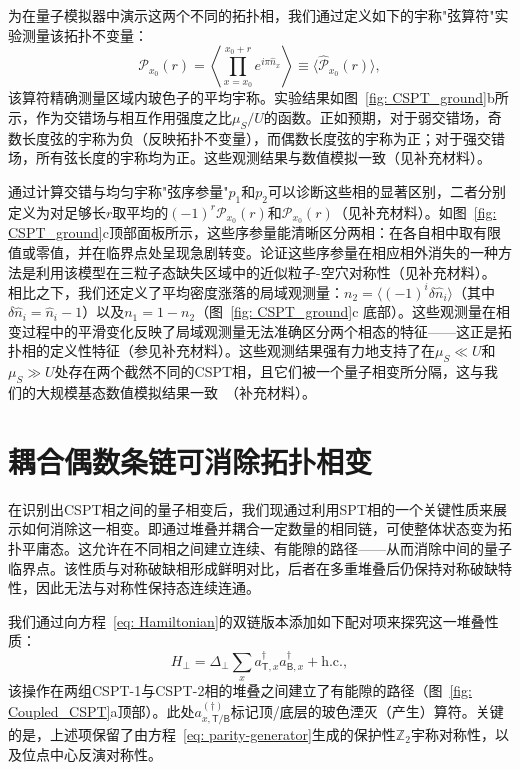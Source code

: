 \documentclass[preprint,superscriptaddress,floatfix, nofootinbib]{revtex4-2}
\begin{document}
\begin{CJK*}{UTF8}{gbsn}
为在量子模拟器中演示这两个不同的拓扑相，我们通过定义如下的宇称"弦算符"实验测量\cite{Hilker17, Wei23}该拓扑不变量：
\begin{equation}
\label{eq: POP}
\mathcal{P}_{x_0}(r) =  \left\langle \prod_{x=x_0}^{x_0+r} e^{i\pi \hat n_x}\right\rangle \equiv \langle \hat{\mathcal{P}}_{x_0}(r) \rangle,
\end{equation}
该算符精确测量区域内玻色子的平均宇称。实验结果如图~\ref{fig: CSPT_ground}b所示，作为交错场与相互作用强度之比$\mu_S/U$的函数。正如预期，对于弱交错场，奇数长度弦的宇称为负（反映拓扑不变量），而偶数长度弦的宇称为正；对于强交错场，所有弦长度的宇称均为正。这些观测结果与数值模拟一致（见补充材料）。

通过计算交错与均匀宇称"弦序参量"$p_1$和$p_2$可以诊断这些相的显著区别，二者分别定义为对足够长$r$取平均的$(-1)^{r} \mathcal{P}_{x_0}(r)$和$\mathcal{P}_{x_0}(r)$（见补充材料）。如图~\ref{fig: CSPT_ground}c顶部面板所示，这些序参量能清晰区分两相：在各自相中取有限值或零值，并在临界点处呈现急剧转变。论证这些序参量在相应相外消失的一种方法是利用该模型在三粒子态缺失区域中的近似粒子-空穴对称性（见补充材料）。
相比之下，我们还定义了平均密度涨落的局域观测量：$n_2= \langle (-1)^i\delta\hat{n}_i\rangle $（其中$\delta \hat{n}_i=\hat{n}_i-1$）以及$n_1= 1 - n_2$（图~\ref{fig: CSPT_ground}c 底部）。这些观测量在相变过程中的平滑变化反映了局域观测量无法准确区分两个相态的特征——这正是拓扑相的定义性特征（参见补充材料）。这些观测结果强有力地支持了在$\mu_S \ll U$和$\mu_S \gg U$处存在两个截然不同的CSPT相，且它们被一个量子相变所分隔，这与我们的大规模基态数值模拟结果一致~\cite{Sahay2025}（补充材料）。
\section{耦合偶数条链可消除拓扑相变}

在识别出CSPT相之间的量子相变后，我们现通过利用SPT相的一个关键性质来展示如何消除这一相变。即通过堆叠并耦合一定数量的相同链，可使整体状态变为拓扑平庸态\cite{Turner11, Fidkowski11, Pollmann2012, Schuch2011, Chen2011, Chen2012}。这允许在不同相之间建立连续、有能隙的路径——从而消除中间的量子临界点。该性质与对称破缺相形成鲜明对比，后者在多重堆叠后仍保持对称破缺特性，因此无法与对称性保持态连续连通。

我们通过向方程~\eqref{eq: Hamiltonian}的双链版本添加如下配对项来探究这一堆叠性质：
\begin{equation}
    H_{\perp} = \Delta_{\perp} \sum_{x} a^{\dagger}_{\mathsf{T}, x} a^{\dagger}_{\mathsf{B}, x}   + \text{h.c.},
\label{eq: coupling}
\end{equation}
该操作在两组CSPT-1与CSPT-2相的堆叠之间建立了有能隙的路径（图~\ref{fig: Coupled_CSPT}a顶部）。此处$a_{x, \mathsf{T}/\mathsf{B}}^{(\dagger)}$标记顶/底层的玻色湮灭（产生）算符。关键的是，上述项保留了由方程~\eqref{eq: parity-generator}生成的保护性$\mathbb{Z}_2$宇称对称性，以及位点中心反演对称性。


\end{CJK*}
\end{document}
